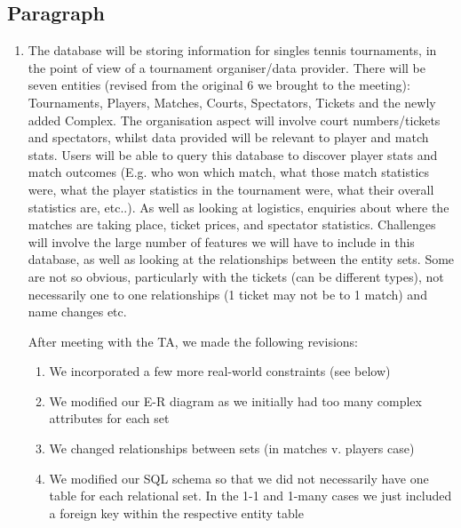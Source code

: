 \documentclass[11pt]{article}
\begin{document}

\begin{mdframed}
\end{mdframed}


\hfill \break
\raggedright\subsection*{Paragraph}

\begin{enumerate}

\item The database will be storing information for singles tennis tournaments, in the point of view of a tournament organiser/data provider. There will be seven entities (revised from the original 6 we brought to the meeting): Tournaments, Players, Matches, Courts, Spectators, Tickets and the newly added Complex. The organisation aspect will involve court numbers/tickets and spectators, whilst data provided will be relevant to player and match stats. Users will be able to query this database to discover player stats and match outcomes (E.g. who won which match, what those match statistics were, what the player statistics in the tournament were, what their overall statistics are, etc..). As well as looking at logistics, enquiries about where the matches are taking place, ticket prices, and spectator statistics. Challenges will involve the large number of features we will have to include in this database, as well as looking at the relationships between the entity sets. Some are not so obvious, particularly with the tickets (can be different types), not necessarily one to one relationships (1 ticket may not be to 1 match) and name changes etc. 

After meeting with the TA, we made the following revisions:
\begin{enumerate}[label = (\alph*)]
\item We incorporated a few more real-world constraints (see below)
\item We modified our E-R diagram as we initially had too many complex attributes for each set
\item We changed relationships between sets (in matches v. players case)
\item We modified our SQL schema so that we did not necessarily have one table for each relational set. In the 1-1 and 1-many cases we just included a foreign key within the respective entity table 
\end{enumerate}


\end{enumerate}
\end{document}
